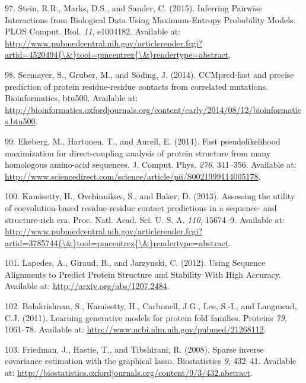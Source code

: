 \documentclass[11pt,a4paper,twoside]{book}
\theoremstyle{definition}
\theoremstyle{definition}
\theoremstyle{remark}
\begin{document}
\hypertarget{ref-Stein2015a}{}
97. Stein, R.R., Marks, D.S., and Sander, C. (2015). Inferring Pairwise
Interactions from Biological Data Using Maximum-Entropy Probability
Models. PLOS Comput. Biol. \emph{11}, e1004182. Available at:
\href{http://www.pubmedcentral.nih.gov/articlerender.fcgi?artid=4520494\%7B/\&\%7Dtool=pmcentrez\%7B/\&\%7Drendertype=abstract}{http://www.pubmedcentral.nih.gov/articlerender.fcgi?artid=4520494\{\textbackslash{}\&\}tool=pmcentrez\{\textbackslash{}\&\}rendertype=abstract}.

\hypertarget{ref-Seemayer2014}{}
98. Seemayer, S., Gruber, M., and Söding, J. (2014). CCMpred-fast and
precise prediction of protein residue-residue contacts from correlated
mutations. Bioinformatics, btu500. Available at:
\url{http://bioinformatics.oxfordjournals.org/content/early/2014/08/12/bioinformatics.btu500}.

\hypertarget{ref-Ekeberg2014}{}
99. Ekeberg, M., Hartonen, T., and Aurell, E. (2014). Fast
pseudolikelihood maximization for direct-coupling analysis of protein
structure from many homologous amino-acid sequences. J. Comput. Phys.
\emph{276}, 341--356. Available at:
\url{http://www.sciencedirect.com/science/article/pii/S0021999114005178}.

\hypertarget{ref-Kamisetty2013}{}
100. Kamisetty, H., Ovchinnikov, S., and Baker, D. (2013). Assessing the
utility of coevolution-based residue-residue contact predictions in a
sequence- and structure-rich era. Proc. Natl. Acad. Sci. U. S. A.
\emph{110}, 15674--9. Available at:
\href{http://www.pubmedcentral.nih.gov/articlerender.fcgi?artid=3785744\%7B/\&\%7Dtool=pmcentrez\%7B/\&\%7Drendertype=abstract}{http://www.pubmedcentral.nih.gov/articlerender.fcgi?artid=3785744\{\textbackslash{}\&\}tool=pmcentrez\{\textbackslash{}\&\}rendertype=abstract}.

\hypertarget{ref-Lapedes2012a}{}
101. Lapedes, A., Giraud, B., and Jarzynski, C. (2012). Using Sequence
Alignments to Predict Protein Structure and Stability With High
Accuracy. Available at: \url{http://arxiv.org/abs/1207.2484}.

\hypertarget{ref-Balakrishnan2011}{}
102. Balakrishnan, S., Kamisetty, H., Carbonell, J.G., Lee, S.-I., and
Langmead, C.J. (2011). Learning generative models for protein fold
families. Proteins \emph{79}, 1061--78. Available at:
\url{http://www.ncbi.nlm.nih.gov/pubmed/21268112}.

\hypertarget{ref-Friedman2008}{}
103. Friedman, J., Hastie, T., and Tibshirani, R. (2008). Sparse inverse
covariance estimation with the graphical lasso. Biostatistics \emph{9},
432--41. Available at:
\url{http://biostatistics.oxfordjournals.org/content/9/3/432.abstract}.
\end{document}
